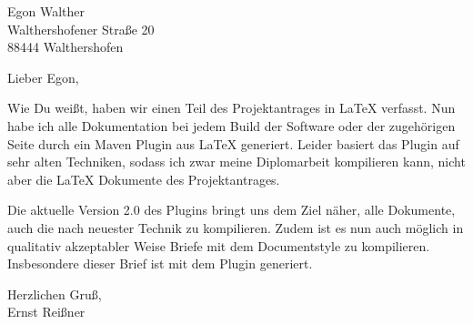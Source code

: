 \documentclass[english,german,a4paper,fontsize=10pt,version=last]{scrlttr2}
\begin{document}
\begin{letter}{Egon Walther \\ Walthershofener Straße 20 \\ 88444 Walthershofen} 
  \opening{Lieber Egon,}

  Wie Du weißt, haben wir einen Teil des Projektantrages in \LaTeX{} verfasst. 
  Nun habe ich alle Dokumentation bei jedem \foreignlanguage{english}{Build} 
  der Software oder der zugehörigen Seite durch ein \foreignlanguage{english}{Maven Plugin} aus \LaTeX{} generiert. 
  Leider basiert das \foreignlanguage{english}{Plugin} auf sehr alten Techniken, 
  sodass ich zwar meine Diplomarbeit kompilieren kann, 
  nicht aber die \LaTeX{} Dokumente des Projektantrages. 

  Die aktuelle Version 2.0 des Plugins bringt uns dem Ziel näher, 
  alle Dokumente, auch die nach neuester Technik zu kompilieren. 
  Zudem ist es nun auch möglich in qualitativ akzeptabler Weise 
  Briefe mit dem \foreignlanguage{english}{Documentstyle} zu kompilieren. 
  Insbesondere dieser Brief ist mit dem Plugin generiert. 


  \closing{Herzlichen Gruß, \\[2\baselineskip]Ernst Reißner }

\end{letter}

%
\end{document}
